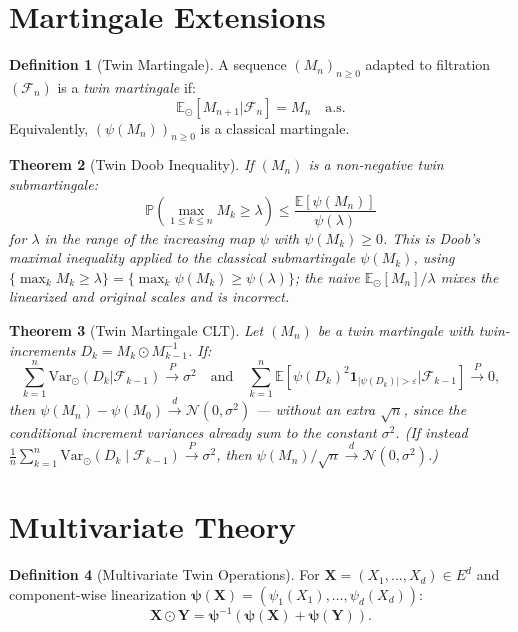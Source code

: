\documentclass[11pt,twoside,openright]{book}
\theoremstyle{plain}
\newtheorem{theorem}{Theorem}[chapter]
\theoremstyle{definition}
\newtheorem{definition}[theorem]{Definition}
\theoremstyle{remark}
\newcommand{\calF}{\mathcal{F}}
\newcommand{\calN}{\mathcal{N}}
\newcommand{\E}{\mathbb{E}}
\newcommand{\Prob}{\mathbb{P}}
\newcommand{\twin}{\odot}
\newcommand{\Etwin}{\mathbb{E}_{\twin}}
\newcommand{\Vartwin}{\mathrm{Var}_{\twin}}
\begin{document}
\section{Martingale Extensions}

\begin{definition}[Twin Martingale]
A sequence $(M_n)_{n \geq 0}$ adapted to filtration $(\calF_n)$ is a \emph{twin martingale} if:
\[
\Etwin[M_{n+1} | \calF_n] = M_n \quad \text{a.s.}
\]
Equivalently, $(\psi(M_n))_{n \geq 0}$ is a classical martingale.
\end{definition}

\begin{theorem}[Twin Doob Inequality]
\label{thm:twin-doob}
If $(M_n)$ is a non-negative twin submartingale:
\begin{equation}
\Prob\left(\max_{1 \leq k \leq n} M_k \geq \lambda\right) \leq \frac{\E[\psi(M_n)]}{\psi(\lambda)}
\label{eq:twin-doob}
\end{equation}
for $\lambda$ in the range of the increasing map $\psi$ with $\psi(M_k)\ge0$. This is Doob's maximal inequality applied to the classical submartingale $\psi(M_k)$, using $\{\max_k M_k\ge\lambda\}=\{\max_k\psi(M_k)\ge\psi(\lambda)\}$; the naive $\Etwin[M_n]/\lambda$ mixes the linearized and original scales and is incorrect.
\end{theorem}

\begin{theorem}[Twin Martingale CLT]
\label{thm:twin-martingale-clt}
Let $(M_n)$ be a twin martingale with twin-increments $D_k = M_k \twin M_{k-1}^{-1}$. If:
\[
\sum_{k=1}^n \Vartwin(D_k | \calF_{k-1}) \xrightarrow{P} \sigma^2 \quad \text{and} \quad \sum_{k=1}^n \E[\psi(D_k)^2 \mathbf{1}_{|\psi(D_k)| > \varepsilon} | \calF_{k-1}] \xrightarrow{P} 0,
\]
then $\psi(M_n)-\psi(M_0) \xrightarrow{d} \calN(0, \sigma^2)$ --- \emph{without} an extra $\sqrt n$, since the conditional increment variances already sum to the constant $\sigma^2$. (If instead $\tfrac1n\sum_{k=1}^n \Vartwin(D_k\mid\calF_{k-1})\xrightarrow{P}\sigma^2$, then $\psi(M_n)/\sqrt n\xrightarrow{d}\calN(0,\sigma^2)$.)
\end{theorem}

\section{Multivariate Theory}

\begin{definition}[Multivariate Twin Operations]
For $\mathbf{X} = (X_1, \ldots, X_d) \in E^d$ and component-wise linearization $\boldsymbol{\psi}(\mathbf{X}) = (\psi_1(X_1), \ldots, \psi_d(X_d))$:
\[
\mathbf{X} \twin \mathbf{Y} = \boldsymbol{\psi}^{-1}(\boldsymbol{\psi}(\mathbf{X}) + \boldsymbol{\psi}(\mathbf{Y})).
\]
\end{definition}
\end{document}
